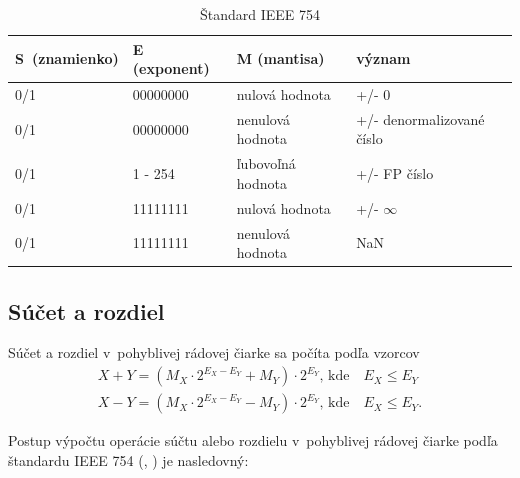\bigskip
\begin{table}[h]
\centering
\begin{tabular}{|l|l|l|l|}
\hline
\rowcolor[HTML]{C0C0C0} 
S~(znamienko) & E (exponent) & M (mantisa)       & význam                    \\ \hline
0/1           & 00000000     & nulová hodnota    & +/- 0                     \\ \hline
0/1           & 00000000     & nenulová hodnota  & +/- denormalizované číslo \\ \hline
0/1           & 1 - 254      & ľubovoľná hodnota & +/- FP číslo              \\ \hline
0/1           & 11111111     & nulová hodnota    & +/- $ \infty  $           \\ \hline
0/1           & 11111111     & nenulová hodnota  & NaN                       \\ \hline
\end{tabular}
\caption{Štandard IEEE 754 \cite{FPOnline}}
\label{standard_IEEE754}
\end{table}

\newpage
\subsection{Súčet a rozdiel} \label{PlusMinusFP}
Súčet a rozdiel v~pohyblivej rádovej čiarke sa počíta podľa vzorcov
\begin{eqnarray}
X + Y = (M_{X}\cdot 2^{E_{X} - E_{Y}} + M_{Y})\cdot 2^{E_{Y}} \text{, kde} \quad E_{X} \leq E_{Y} \\
X - Y = (M_{X}\cdot 2^{E_{X} - E_{Y}} - M_{Y})\cdot 2^{E_{Y}} \text{, kde} \quad E_{X} \leq E_{Y} .
\end{eqnarray}

Postup výpočtu operácie súčtu alebo rozdielu v~pohyblivej rádovej čiarke podľa štandardu IEEE 754 (\cite{FPOnline_operacie}, \cite{CamborBP}) je nasledovný:


